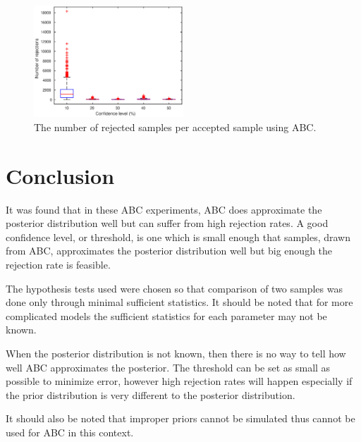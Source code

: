 \documentclass[a4paper,10pt]{article}
\begin{document}
\begin{figure}
\centering
\includegraphics[width=0.5\textwidth]{rejections.eps}
\caption{The number of rejected samples per accepted sample using ABC.}
\label{rejections}
\end{figure}

\section{Conclusion}
It was found that in these ABC experiments, ABC does approximate the posterior distribution well but can suffer from high rejection rates. A good confidence level, or threshold, is one which is small enough that samples, drawn from ABC, approximates the posterior distribution well but big enough the rejection rate is feasible.

The hypothesis tests used were chosen so that comparison of two samples was done only through minimal sufficient statistics. It should be noted that for more complicated models the sufficient statistics for each parameter may not be known.

When the posterior distribution is not known, then there is no way to tell how well ABC approximates the posterior. The threshold can be set as small as possible to minimize error, however high rejection rates will happen especially if the prior distribution is very different to the posterior distribution.

It should also be noted that improper priors cannot be simulated thus cannot be used for ABC in this context.
\end{document}
